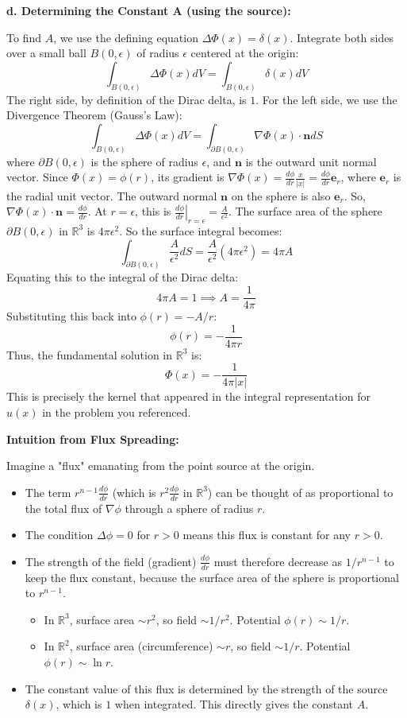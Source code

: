 \textbf{d. Determining the Constant A (using the source):}

To find $A$, we use the defining equation $\Delta \Phi(x) = \delta(x)$. Integrate both sides over a small ball $B(0, \epsilon)$ of radius $\epsilon$ centered at the origin:
\[
\int_{B(0,\epsilon)} \Delta \Phi(x) dV = \int_{B(0,\epsilon)} \delta(x) dV
\]
The right side, by definition of the Dirac delta, is $1$.
For the left side, we use the Divergence Theorem (Gauss's Law):
\[
\int_{B(0,\epsilon)} \Delta \Phi(x) dV = \int_{\partial B(0,\epsilon)} \nabla \Phi(x) \cdot \mathbf{n} dS
\]
where $\partial B(0,\epsilon)$ is the sphere of radius $\epsilon$, and $\mathbf{n}$ is the outward unit normal vector.
Since $\Phi(x) = \phi(r)$, its gradient is $\nabla \Phi(x) = \frac{d\phi}{dr} \frac{x}{|x|} = \frac{d\phi}{dr} \mathbf{e}_r$, where $\mathbf{e}_r$ is the radial unit vector. The outward normal $\mathbf{n}$ on the sphere is also $\mathbf{e}_r$.
So, $\nabla \Phi(x) \cdot \mathbf{n} = \frac{d\phi}{dr}$. At $r=\epsilon$, this is $\left.\frac{d\phi}{dr}\right|_{r=\epsilon} = \frac{A}{\epsilon^2}$.
The surface area of the sphere $\partial B(0,\epsilon)$ in $\mathbb{R}^3$ is $4\pi\epsilon^2$.
So the surface integral becomes:
\[
\int_{\partial B(0,\epsilon)} \frac{A}{\epsilon^2} dS = \frac{A}{\epsilon^2} (4\pi\epsilon^2) = 4\pi A
\]
Equating this to the integral of the Dirac delta:
\[
4\pi A = 1 \implies A = \frac{1}{4\pi}
\]
Substituting this back into $\phi(r) = -A/r$:
\[
\phi(r) = -\frac{1}{4\pi r}
\]
Thus, the fundamental solution in $\mathbb{R}^3$ is:
\[
\Phi(x) = -\frac{1}{4\pi|x|}
\]
This is precisely the kernel that appeared in the integral representation for $u(x)$ in the problem you referenced.

\textbf{Intuition from Flux Spreading:}

Imagine a "flux" emanating from the point source at the origin.

\begin{itemize}
	\item The term $r^{n-1} \frac{d\phi}{dr}$ (which is $r^2 \frac{d\phi}{dr}$ in $\mathbb{R}^3$) can be thought of as proportional to the total flux of $\nabla \phi$ through a sphere of radius $r$.
	\item The condition $\Delta \phi = 0$ for $r>0$ means this flux is constant for any $r>0$.
	\item The strength of the field (gradient) $\frac{d\phi}{dr}$ must therefore decrease as $1/r^{n-1}$ to keep the flux constant, because the surface area of the sphere is proportional to $r^{n-1}$.
	\begin{itemize}
		\item In $\mathbb{R}^3$, surface area $\sim r^2$, so field $\sim 1/r^2$. Potential $\phi(r) \sim 1/r$.
		\item In $\mathbb{R}^2$, surface area (circumference) $\sim r$, so field $\sim 1/r$. Potential $\phi(r) \sim \ln r$.
	\end{itemize}
	\item The constant value of this flux is determined by the strength of the source $\delta(x)$, which is $1$ when integrated. This directly gives the constant $A$.
\end{itemize}


